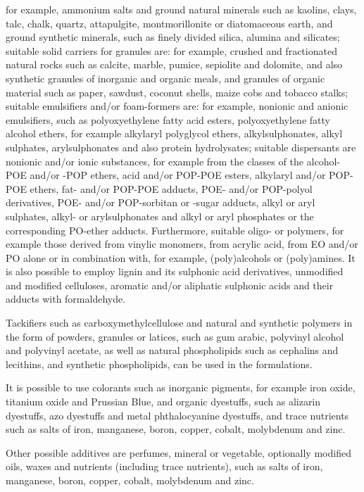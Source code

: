 \documentclass[11pt,a4paper]{article}
\begin{document}
for example, ammonium salts and ground natural minerals such as kaolins, clays, talc, chalk, quartz, attapulgite, montmorillonite or diatomaceous earth, and ground synthetic minerals, such as finely divided silica, alumina and silicates; suitable solid carriers for granules are: for example, crushed and fractionated natural rocks such as calcite, marble, pumice, sepiolite and dolomite, and also synthetic granules of inorganic and organic meals, and granules of organic material such as paper, sawdust, coconut shells, maize cobs and tobacco stalks; suitable emulsifiers and/or foam-formers are: for example, nonionic and anionic emulsifiers, such as polyoxyethylene fatty acid esters, polyoxyethylene fatty alcohol ethers, for example alkylaryl polyglycol ethers, alkylsulphonates, alkyl sulphates, arylsulphonates and also protein hydrolysates; suitable dispersants are nonionic and/or ionic substances, for example from the classes of the alcohol-POE and/or -POP ethers, acid and/or POP-POE esters, alkylaryl and/or POP-POE ethers, fat- and/or POP-POE adducts, POE- and/or POP-polyol derivatives, POE- and/or POP-sorbitan or -sugar adducts, alkyl or aryl sulphates, alkyl- or arylsulphonates and alkyl or aryl phosphates or the corresponding PO-ether adducts. Furthermore, suitable oligo- or polymers, for example those derived from vinylic monomers, from acrylic acid, from EO and/or PO alone or in combination with, for example, (poly)alcohols or (poly)amines. It is also possible to employ lignin and its sulphonic acid derivatives, unmodified and modified celluloses, aromatic and/or aliphatic sulphonic acids and their adducts with formaldehyde.

Tackifiers such as carboxymethylcellulose and natural and synthetic polymers in the form of powders, granules or latices, such as gum arabic, polyvinyl alcohol and polyvinyl acetate, as well as natural phospholipids such as cephalins and lecithins, and synthetic phospholipids, can be used in the formulations.

It is possible to use colorants such as inorganic pigments, for example iron oxide, titanium oxide and Prussian Blue, and organic dyestuffs, such as alizarin dyestuffs, azo dyestuffs and metal phthalocyanine dyestuffs, and trace nutrients such as salts of iron, manganese, boron, copper, cobalt, molybdenum and zinc.

Other possible additives are perfumes, mineral or vegetable, optionally modified oils, waxes and nutrients (including trace nutrients), such as salts of iron, manganese, boron, copper, cobalt, molybdenum and zinc.
\end{document}
